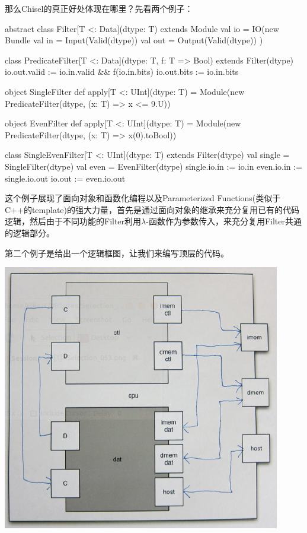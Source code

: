 \documentclass[twocolumn,10pt]{article}
\begin{document}
	那么Chisel的真正好处体现在哪里？先看两个例子：
	\begin{scala}
abstract class Filter[T <: Data](dtype: T) extends Module {
	val io = IO(new Bundle {
		val in = Input(Valid(dtype))
		val out = Output(Valid(dtype))
	})
}

class PredicateFilter[T <: Data](dtype: T, f: T => Bool) extends Filter(dtype) {
	io.out.valid := io.in.valid && f(io.in.bits)
	io.out.bits  := io.in.bits
}

object SingleFilter {
	def apply[T <: UInt](dtype: T) = 
	Module(new PredicateFilter(dtype, (x: T) => x <= 9.U))
}

object EvenFilter {
	def apply[T <: UInt](dtype: T) = 
	Module(new PredicateFilter(dtype, (x: T) => x(0).toBool))
}

class SingleEvenFilter[T <: UInt](dtype: T) extends Filter(dtype) {
	val single = SingleFilter(dtype)
	val even   = EvenFilter(dtype)
	single.io.in  := io.in
	even.io.in    := single.io.out
	io.out        := even.io.out
}
	\end{scala}
	这个例子展现了面向对象和函数化编程以及Parameterized Functions(类似于C++的template)的强大力量，首先是通过面向对象的继承来充分复用已有的代码逻辑，然后由于不同功能的Filter利用$\lambda$-函数作为参数传入，来充分复用Filter共通的逻辑部分。
	
	第二个例子是给出一个逻辑框图，让我们来编写顶层的代码。
	
	\includegraphics[width=\linewidth]{Bulk.png}
	
\end{document}
